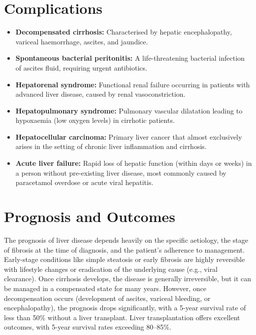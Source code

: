 \section*{Complications}
\begin{itemize}
    \item \textbf{Decompensated cirrhosis:} Characterised by hepatic encephalopathy, variceal haemorrhage, ascites, and jaundice.
    \item \textbf{Spontaneous bacterial peritonitis:} A life-threatening bacterial infection of ascites fluid, requiring urgent antibiotics.
    \item \textbf{Hepatorenal syndrome:} Functional renal failure occurring in patients with advanced liver disease, caused by renal vasoconstriction.
    \item \textbf{Hepatopulmonary syndrome:} Pulmonary vascular dilatation leading to hypoxaemia (low oxygen levels) in cirrhotic patients.
    \item \textbf{Hepatocellular carcinoma:} Primary liver cancer that almost exclusively arises in the setting of chronic liver inflammation and cirrhosis.
    \item \textbf{Acute liver failure:} Rapid loss of hepatic function (within days or weeks) in a person without pre-existing liver disease, most commonly caused by paracetamol overdose or acute viral hepatitis.
\end{itemize}

\section*{Prognosis and Outcomes}
The prognosis of liver disease depends heavily on the specific aetiology, the stage of fibrosis at the time of diagnosis, and the patient's adherence to management. Early-stage conditions like simple steatosis or early fibrosis are highly reversible with lifestyle changes or eradication of the underlying cause (e.g., viral clearance). Once cirrhosis develops, the disease is generally irreversible, but it can be managed in a compensated state for many years. However, once decompensation occurs (development of ascites, variceal bleeding, or encephalopathy), the prognosis drops significantly, with a 5-year survival rate of less than 50\% without a liver transplant. Liver transplantation offers excellent outcomes, with 5-year survival rates exceeding 80--85\%.

